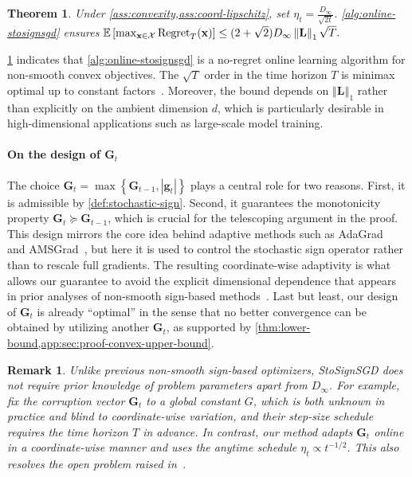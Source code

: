\documentclass{article}
\newtheorem{thm}{Theorem}
\newtheorem{remark}{Remark}
\def \E {\mathbb{E}}
\def \x {\mathbf{x}}
\def \g {\mathbf{g}}
\def \Gb {\mathbf{G}}
\def \Lb {\mathbf{L}}
\def \X {\mathcal{X}}
\newcommand{\norm}[1]{\left\Vert#1\right\Vert}
\newcommand{\abs}[1]{\left|#1\right|}
\newcommand{\sqbrac}[1]{\left[#1\right]}
\newcommand{\cbrac}[1]{\left\{#1\right\}}
\begin{document}
\begin{thm}\label{thm:oco-bound}
    Under \cref{ass:convexity,ass:coord-lipschitz}, set $\eta_t=\frac{D_\infty}{\sqrt{2t}}$. \cref{alg:online-stosignsgd} ensures $\E\sqbrac{\max_{\x\in\X}\textnormal{Regret}_T(\x)}\le(2+\sqrt{2})D_\infty\norm{\Lb}_1\sqrt{T}.$



\end{thm}

\cref{thm:oco-bound} indicates that \cref{alg:online-stosignsgd} is a no-regret online learning algorithm for non-smooth convex objectives. The $\sqrt{T}$ order in the time horizon $T$ is minimax optimal up to constant factors~\citep{abernethy2008optimal}. Moreover, the bound depends on $\norm{\Lb}_1$ rather than explicitly on the ambient dimension $d$, which is particularly desirable in high-dimensional applications such as large-scale model training.

\paragraph{On the design of $\Gb_t$}
The choice $\Gb_t=\max\cbrac{\Gb_{t-1},\abs{\g_t}}$ plays a central role for two reasons. First, it is admissible by \cref{def:stochastic-sign}. Second, it guarantees the monotonicity property $\Gb_t\succeq \Gb_{t-1}$, which is crucial for the telescoping argument in the proof. This design mirrors the core idea behind adaptive methods such as AdaGrad~\citep{duchi2011adaptive} and AMSGrad~\citep{reddi2018convergence}, but here it is used to control the stochastic sign operator rather than to rescale full gradients. The resulting coordinate-wise adaptivity is what allows our guarantee to avoid the explicit dimensional dependence that appears in prior analyses of non-smooth sign-based methods~\citep{jin2020stochastic,safaryan2021stochastic,chzhen2023signsvrg,sun2023momentum,NeurIPS:2024:Jiang,jiang2025improved}. Last but least, our design of $\Gb_t$ is already ``optimal'' in the sense that no better convergence can be obtained by utilizing another $\Gb_t$, as supported by \cref{thm:lower-bound,app:sec:proof-convex-upper-bound}. 

\begin{remark}
    Unlike previous non-smooth sign-based optimizers, StoSignSGD does not require prior knowledge of problem parameters apart from $D_\infty$. For example,~\citet{chzhen2023signsvrg} fix the corruption vector $\Gb_t$ to a global constant $G$, which is both unknown in practice and blind to coordinate-wise variation, and their step-size schedule requires the time horizon $T$ in advance. In contrast, our method adapts $\Gb_t$ online in a coordinate-wise manner and uses the anytime schedule $\eta_t\propto t^{-1/2}$. This also resolves the open problem raised in~\citet[Remark~1]{chzhen2023signsvrg}.
\end{remark}
\end{document}
